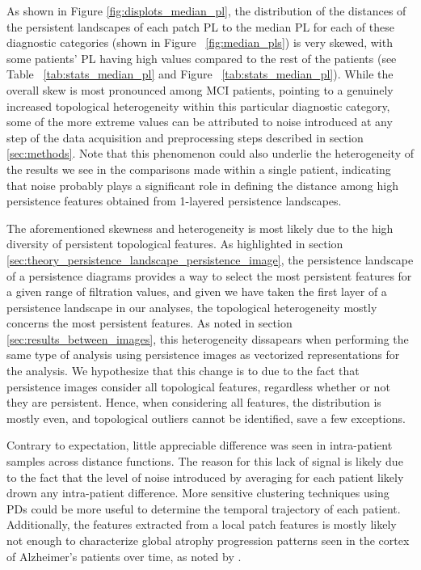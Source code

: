 \documentclass{article}
\begin{document}
As shown in Figure \ref{fig:displots_median_pl}, the distribution of the distances of the persistent landscapes of each patch PL to the median PL for each of these diagnostic categories (shown in Figure ~\ref{fig:median_pls}) is very skewed, with some patients' PL having high values compared to the rest of the patients (see Table ~\ref{tab:stats_median_pl} and Figure ~\ref{tab:stats_median_pl}). While the overall skew is most pronounced among MCI patients, pointing to a genuinely increased topological heterogeneity within this particular diagnostic category, some of the more extreme values can be attributed to noise introduced at any step of the data acquisition and preprocessing steps described in section \ref{sec:methods}. Note that this phenomenon could also underlie the heterogeneity of the results we see in the comparisons made within a single patient, indicating that noise probably plays a significant role in defining the distance among high persistence features obtained from 1-layered persistence landscapes.

The aforementioned skewness and heterogeneity is most likely due to the high diversity of persistent topological features. As highlighted in section \ref{sec:theory_persistence_landscape_persistence_image}, the persistence landscape of a persistence diagrams provides a way to select the most persistent features for a given range of filtration values, and given we have taken the first layer of a persistence landscape in our analyses, the topological heterogeneity mostly concerns the most persistent features. As noted in section \ref{sec:results_between_images}, this heterogeneity dissapears when performing the same type of analysis using persistence images as vectorized representations for the analysis. We hypothesize that this change is to due to the fact that persistence images consider all topological features, regardless whether or not they are persistent. Hence, when considering all features, the distribution is mostly even, and topological outliers cannot be identified, save a few exceptions.

Contrary to expectation, little appreciable difference was seen in intra-patient samples across distance functions. The reason for this lack of signal is likely due to the fact that the level of noise introduced by averaging for each patient likely drown any intra-patient difference. More sensitive clustering techniques using PDs could be more useful to determine the temporal trajectory of each patient. Additionally, the features extracted from a local patch features is mostly likely not enough to characterize global atrophy progression patterns seen in the cortex of Alzheimer's patients over time, as noted by \citep{toniolo2018patterns}.
\end{document}
